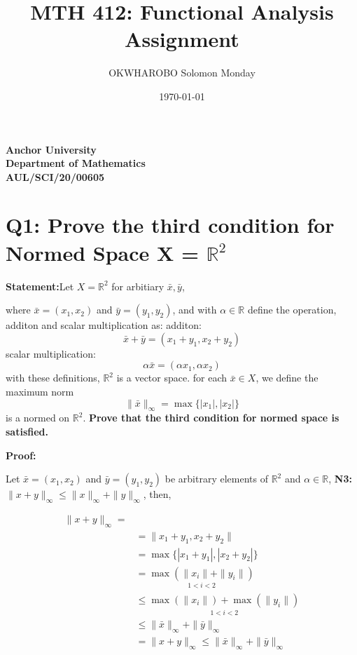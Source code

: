 \documentclass[12pt]{article}
\title{MTH 412: Functional Analysis Assignment}
\author{OKWHAROBO Solomon Monday}
\date{\today}
\begin{document}
\maketitle

\thispagestyle{empty} %

\begin{center}
    \vspace{6cm}
    \textbf{Anchor University} \\
    \textbf{Department of Mathematics} \\
    \textbf{AUL/SCI/20/00605}
\end{center}





\newpage

\setcounter{page}{1} %




\section{Q1: Prove the third condition for Normed Space X = $\mathbb{R}^{2}$ }

\textbf{Statement:}Let $X = \mathbb{R}^{2}$ for arbitiary $\bar{x}, \bar{y}$,

where $\bar{x} = (x_{1}, x_{2})$ and $\bar{y} = (y_{1}, y_{2})$, and with $\alpha \in \mathbb{R}$  define the operation, additon and scalar multiplication as:
\newline
additon:
\[\bar{x} + \bar{y} = (x_{1} + y_{1}, x_{2} + y_{2})\]
scalar multiplication:
\[\alpha \bar{x} = (\alpha x_{1}, \alpha x_{2})\]
with these definitions, $\mathbb{R}^{2}$ is a vector space.
for each $\bar{x} \in X$, we define the maximum norm
\[\|\bar{x}\|_{\infty} = \max\{|x_{1}|, |x_{2}|\}\] is a normed on $\mathbb{R}^{2}$.
\newline
\textbf{Prove that the third condition for normed space is satisfied.}
\newblock

\textbf{Proof:}

Let $\bar{x} = (x_{1}, x_{2})$ and $\bar{y} = (y_{1}, y_{2})$ be arbitrary elements of $\mathbb{R}^{2}$ and $\alpha \in \mathbb{R}$,
\newline
\textbf{N3: }$\| x+ y \|_{\infty} \leq  \| x \|_{\infty} + \|y\|_{\infty} $, then,


\begin{center}
    \begin{eqnarray*}
      \| x+ y \|_{\infty} =\\
      & = \|x_{1} + y_{1},x_{2} + y_{2}\| \\
      & = \max\{|x_{1} + y_{1}|, |x_{2} + y_{2}|\} \\
      & = \underset{1 < i < 2}{\max(\| x_i \| + \| y_i \|)} \\
      & \leq  \underset{1 < i < 2}{\max(\| x_i \|) + \max(\| y_i \|)} \\
      & \leq  \|\bar{x}\|_{\infty} + \|\bar{y}\|_{\infty} \\
      & = \| x + y \|_{\infty} \leq \|\bar{x}\|_{\infty} + \|\bar{y}\|_{\infty}
    \end{eqnarray*}
\end{center}
\end{document}
